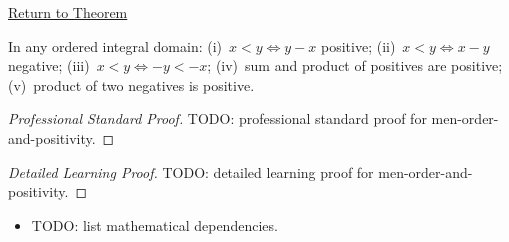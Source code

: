 \newpage
{}
\label{prf:men-order-and-positivity}

\begin{remark*}[Return]
\hyperref[thm:men-order-and-positivity]{Return to Theorem}
\end{remark*}

\begin{theorem*}
In any ordered integral domain:
(i)~$x<y \iff y-x$ positive;
(ii)~$x<y \iff x-y$ negative;
(iii)~$x<y \iff -y<-x$;
(iv)~sum and product of positives are positive;
(v)~product of two negatives is positive.
\end{theorem*}

\begin{proof}[Professional Standard Proof]
\LRAProofBodyStart
TODO: professional standard proof for men-order-and-positivity.
\end{proof}

\begin{proof}[Detailed Learning Proof]
\LRAProofBodyStart
TODO: detailed learning proof for men-order-and-positivity.
\end{proof}

\begin{remark*}
\end{remark*}

\begin{dependencies}
\begin{itemize}
  \item TODO: list mathematical dependencies.
\end{itemize}
\end{dependencies}

\clearpage
